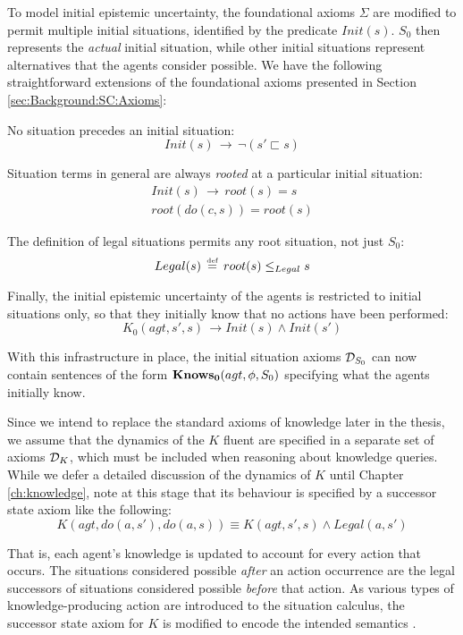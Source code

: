 To model initial epistemic uncertainty, the foundational axioms $\Sigma$
are modified to permit multiple initial situations, identified by
the predicate $Init(s)$. $S_{0}$ then represents the \emph{actual}
initial situation, while other initial situations represent alternatives
that the agents consider possible. We have the following straightforward
extensions of the foundational axioms presented in Section \ref{sec:Background:SC:Axioms}:

No situation precedes an initial situation:\[
Init(s)\,\rightarrow\,\neg(s'\sqsubset s)\]


Situation terms in general are always \emph{rooted} at a particular
initial situation:\begin{gather*}
Init(s)\,\rightarrow\, root(s)=s\\
root(do(c,s))=root(s)\end{gather*}


The definition of legal situations permits any root situation, not
just $S_{0}$:\[
Legal(s)\,\stackrel{\mbox{\tiny def}}{=}\, root(s)\leq_{Legal}s\]


Finally, the initial epistemic uncertainty of the agents is restricted
to initial situations only, so that they initially know that no actions
have been performed:\[
K_{0}(agt,s',s)\,\rightarrow Init(s)\wedge Init(s')\]


With this infrastructure in place, the initial situation axioms $\mathcal{D}_{S_{0}}$
can now contain sentences of the form $\mathbf{Knows_{0}}(agt,\phi,S_{0})$ specifying
what the agents initially know.

Since we intend to replace the standard axioms of knowledge later
in the thesis, we assume that the dynamics of the $K$ fluent are
specified in a separate set of axioms $\mathcal{D}_{K}$, which must be included
when reasoning about knowledge queries. While we defer a detailed
discussion of the dynamics of $K$ until Chapter \ref{ch:knowledge},
note at this stage that its behaviour is specified by a successor
state axiom like the following:\[
K(agt,do(a,s'),do(a,s))\equiv K(agt,s',s)\wedge Legal(a,s')\]


That is, each agent's knowledge is updated to account for every action
that occurs. The situations considered possible \emph{after} an action
occurrence are the legal successors of situations considered possible
\emph{before} that action. As various types of knowledge-producing
action are introduced to the situation calculus, the successor state
axiom for $K$ is modified to encode the intended semantics \citep{shapiro98specifying_ma_systems,Lesperance99sitcalc_approach,shapiro01casl_feat_inter,Petrick06thesis,shapiro07sc_goal_change}.

